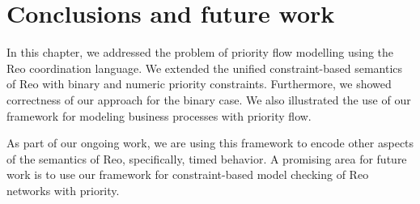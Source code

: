 \section{Conclusions and future work}
\label{sec:conclusionsprio}
In this chapter, we addressed the problem of priority flow modelling using the Reo coordination language.
We extended the unified constraint-based semantics of Reo with binary and numeric priority constraints. Furthermore, we showed correctness of our approach for the binary case. %
We also illustrated the use of our framework for modeling business processes with priority flow.

As part of our ongoing work, we are using this framework to encode other aspects of the semantics of Reo, specifically, timed behavior. A promising area for future work is to use our framework for constraint-based model checking of Reo networks with priority. 
